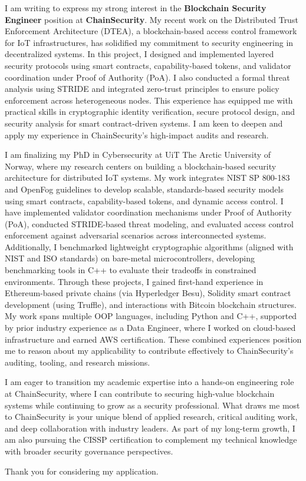 I am writing to express my strong interest in the \textbf{Blockchain Security Engineer} position at \textbf{ChainSecurity}. My recent work on the Distributed Trust Enforcement Architecture (DTEA), a blockchain-based access control framework for IoT infrastructures, has solidified my commitment to security engineering in decentralized systems. In this project, I designed and implemented layered security protocols using smart contracts, capability-based tokens, and validator coordination under Proof of Authority (PoA). I also conducted a formal threat analysis using STRIDE and integrated zero-trust principles to ensure policy enforcement across heterogeneous nodes. This experience has equipped me with practical skills in cryptographic identity verification, secure protocol design, and security analysis for smart contract-driven systems. I am keen to deepen and apply my experience in ChainSecurity’s high-impact audits and research.

I am finalizing my PhD in Cybersecurity at UiT The Arctic University of Norway, where my research centers on building a blockchain-based security architecture for distributed IoT systems. My work integrates NIST SP 800-183 and OpenFog guidelines to develop scalable, standards-based security models using smart contracts, capability-based tokens, and dynamic access control. I have implemented validator coordination mechanisms under Proof of Authority (PoA), conducted STRIDE-based threat modeling, and evaluated access control enforcement against adversarial scenarios across interconnected systems. Additionally, I benchmarked lightweight cryptographic algorithms (aligned with NIST and ISO standards) on bare-metal microcontrollers, developing benchmarking tools in C++ to evaluate their tradeoffs in constrained environments. Through these projects, I gained first-hand experience in Ethereum-based private chains (via Hyperledger Besu), Solidity smart contract development (using Truffle), and interactions with Bitcoin blockchain structures. My work spans multiple OOP languages, including Python and C++, supported by prior industry experience as a Data Engineer, where I worked on cloud-based infrastructure and earned AWS certification. These combined experiences position me to reason about my applicability to contribute effectively to ChainSecurity’s auditing, tooling, and research missions.


I am eager to transition my academic expertise into a hands-on engineering role at ChainSecurity, where I can contribute to securing high-value blockchain systems while continuing to grow as a security professional. What draws me most to ChainSecurity is your unique blend of applied research, critical auditing work, and deep collaboration with industry leaders. As part of my long-term growth, I am also pursuing the CISSP certification to complement my technical knowledge with broader security governance perspectives.

Thank you for considering my application.